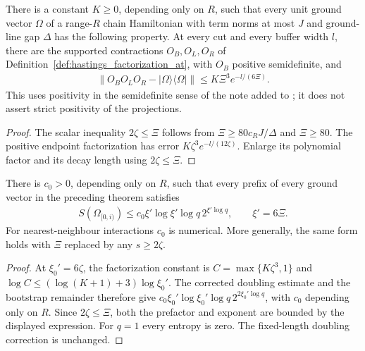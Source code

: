 \begin{lemma}
    \label{thm:hastings_source_length_factorization}
    \leanok
    There is a constant $K\ge0$, depending only on $R$, such that every
    unit ground vector $\Omega$ of a range-$R$ chain Hamiltonian with term
    norms at most $J$ and ground-line gap $\Delta$ has the following property.
    At every cut and every buffer width $l$, there are the supported
    contractions $O_B,O_L,O_R$ of Definition~\ref{def:hastings_factorization_at},
    with $O_B$ positive semidefinite, and
    \begin{align*}
        \|O_BO_LO_R-|\Omega\rangle\langle\Omega|\|
        \le K\Xi^3e^{-l/(6\Xi)}.
    \end{align*}
    This uses positivity in the semidefinite sense of the note added to
    \cite{Hastings2007AreaLaw}; it does not assert strict positivity of
    the projections.
\end{lemma}
\begin{proof}\leanok
    The scalar inequality $2\zeta\le\Xi$ follows from
    $\Xi\ge80c_RJ/\Delta$ and $\Xi\ge80$.
    The positive endpoint factorization has error
    $K\zeta^3e^{-l/(12\zeta)}$. Enlarge its polynomial factor and its
    decay length using $2\zeta\le\Xi$.
\end{proof}

\begin{lemma}
    \label{thm:hastings_source_length_entropy}
    \leanok
    There is $c_0>0$, depending only on $R$, such that every prefix of
    every ground vector in the preceding theorem satisfies
    \begin{align*}
        S(\Omega_{[0,i)})\le c_0\xi'\log\xi'\log q\,2^{\xi'\log q},
        \qquad \xi'=6\Xi.
    \end{align*}
    For nearest-neighbour interactions $c_0$ is numerical. More generally,
    the same form holds with $\Xi$ replaced by any $s\ge2\zeta$.
\end{lemma}
\begin{proof}\leanok
    At $\xi_0'=6\zeta$, the factorization constant is
    $C=\max\{K\zeta^3,1\}$ and
    $\log C\le(\log(K+1)+3)\log\xi_0'$.
    The corrected doubling estimate and the bootstrap remainder therefore
    give $c_0\xi_0'\log\xi_0'\log q\,2^{2\xi_0'\log q}$, with $c_0$
    depending only on $R$. Since $2\zeta\le\Xi$, both the prefactor and
    exponent are bounded by the displayed expression. For $q=1$ every
    entropy is zero. The fixed-length doubling correction is unchanged.
\end{proof}
